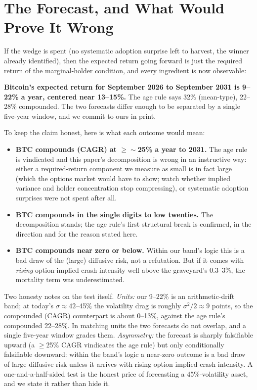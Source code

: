 \documentclass[11pt]{article}
\begin{document}
\section{The Forecast, and What Would Prove It Wrong}

If the wedge is spent (no systematic adoption surprise left to harvest, the winner already identified), then the expected return going forward is just the required return of the marginal-holder condition, and every ingredient is now observable:

\textbf{Bitcoin's expected return for September 2026 to September 2031 is 9--22\% a year, centered near 13--15\%.} The age rule says 32\% (mean-type), 22--28\% compounded. The two forecasts differ enough to be separated by a single five-year window, and we commit to ours in print.

To keep the claim honest, here is what each outcome would mean:
\begin{itemize}
\item \textbf{BTC compounds (CAGR) at $\geq\sim$25\% a year to 2031.} The age rule is vindicated and this paper's decomposition is wrong in an instructive way: either a required-return component we measure as small is in fact large (which the options market would have to show; watch whether implied variance and holder concentration stop compressing), or systematic adoption surprises were not spent after all.
\item \textbf{BTC compounds in the single digits to low twenties.} The decomposition stands; the age rule's first structural break is confirmed, in the direction and for the reason stated here.
\item \textbf{BTC compounds near zero or below.} Within our band's logic this is a bad draw of the (large) diffusive risk, not a refutation. But if it comes with \emph{rising} option-implied crash intensity well above the graveyard's 0.3--3\%, the mortality term was underestimated.
\end{itemize}

Two honesty notes on the test itself. \emph{Units:} our 9--22\% is an arithmetic-drift band; at today's $\sigma \approx 42$--45\% the volatility drag is roughly $\sigma^2/2 \approx 9$ points, so the compounded (CAGR) counterpart is about 0--13\%, against the age rule's compounded 22--28\%. In matching units the two forecasts do not overlap, and a single five-year window grades them. \emph{Asymmetry:} the forecast is sharply falsifiable upward (a $\geq$25\% CAGR vindicates the age rule) but only conditionally falsifiable downward: within the band's logic a near-zero outcome is a bad draw of large diffusive risk unless it arrives with rising option-implied crash intensity. A one-and-a-half-sided test is the honest price of forecasting a 45\%-volatility asset, and we state it rather than hide it.
\end{document}

